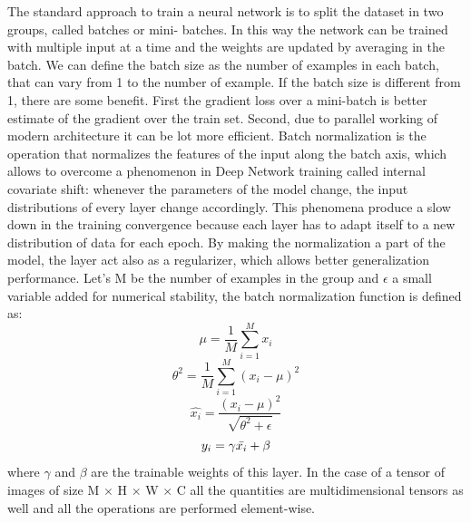 \documentclass[a4paper, 10pt]{book}
\begin{document}
The standard approach to train a neural network is to split the dataset in two groups, called batches or mini- batches. In this way the network can be trained with  multiple input at a time and the weights are updated by averaging in the batch.
We can define the batch size as the number of examples in each batch, that can vary from 1 to the number of example.
If the batch size is different from 1, there are some benefit. First the gradient loss over a mini-batch  is better estimate  of the gradient over the train set.
Second, due to parallel working of modern architecture it can be lot more efficient. 
Batch normalization is the operation that normalizes the features of the input along the batch axis, which allows to overcome a phenomenon in Deep Network training called internal covariate shift: whenever the parameters of the model change, the input distributions of every layer change accordingly.
This phenomena produce a slow down in the training convergence because each layer has to adapt itself to a new distribution of data for each epoch.
By making the normalization  a part of the model, the layer act also as a regularizer,  which allows better generalization performance.
Let's M be the number of examples in the group and $\epsilon $ a small variable added for numerical stability, the batch normalization function is defined as:
\begin{equation}
    \label{mu}
\mu = \frac{1}{M}\sum\limits_{i=1}^M x_i\end{equation}
\begin{equation}
    \label{theta}
\theta ^2 = \frac{1}{M}\sum\limits_{i=1}^M (x_i -\mu)^2 \end{equation}
\begin{equation}
    \label{x_i}
\hat{x_i} = \frac{(x_i-\mu)^2}{\sqrt{\theta^2 + \epsilon}} \end{equation}
\begin{equation}
    \label{y_i}
y_i=\gamma\Bar{x_i}+\beta \end{equation}
where $\gamma$ and $\beta $ are the trainable weights of this layer. In the case of a tensor of images of size M $\times$ H $\times$ W $\times$ C all the quantities are multidimensional tensors as well and all the operations are performed element-wise.
\end{document}
